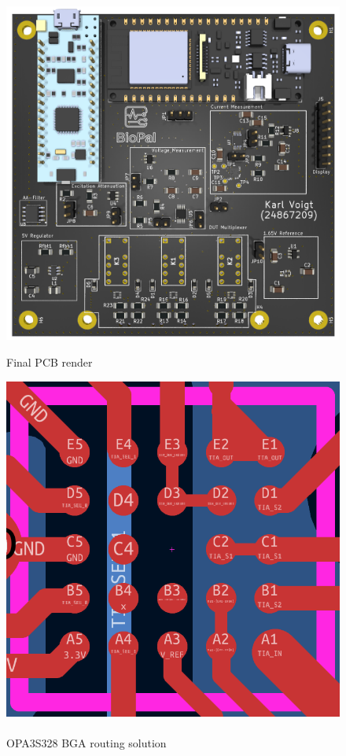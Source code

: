 \begin{figure}[ht]
    \centering
    \begin{minipage}{0.4\textwidth}
        \centering
        \includegraphics[width=\textwidth]{BioPal_render.png}
        \caption{Final PCB render}
        \label{fig:final_pcb}
    \end{minipage}\hfill
    \begin{minipage}{0.35\textwidth}
        \centering
        \includegraphics[width=\textwidth]{BGA_Routing.png}
        \caption{\\OPA3S328 BGA routing solution}
        \label{fig:bga_routing}
    \end{minipage}
\end{figure}

